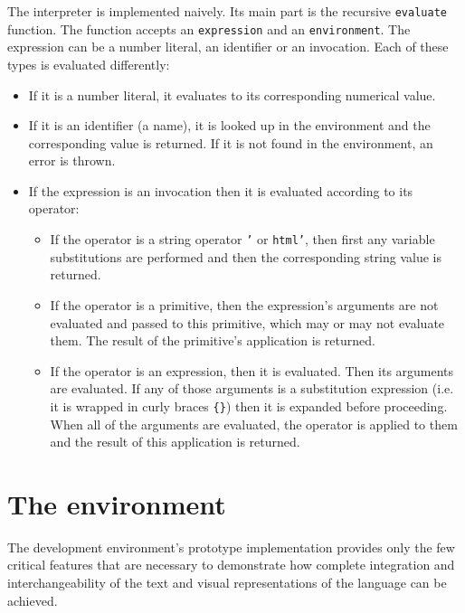 The interpreter is implemented naively. Its main part is the recursive \texttt{evaluate} function. The function accepts an \texttt{expression} and an \texttt{environment}. The expression can be a number literal, an identifier or an invocation. Each of these types is evaluated differently:
\begin{itemize}
\item If it is a number literal, it evaluates to its corresponding numerical value.

\item If it is an identifier (a name), it is looked up in the environment and the corresponding value is returned. If it is not found in the environment, an error is thrown.

\item If the expression is an invocation then it is evaluated according to its operator:
\begin{itemize}
\item If the operator is a string operator \texttt{'} or \texttt{html'}, then first any variable substitutions are performed and then the corresponding string value is returned.
\item If the operator is a primitive, then the expression's arguments are not evaluated and passed to this primitive, which may or may not evaluate them. The result of the primitive's application is returned.
\item If the operator is an expression, then it is evaluated. Then its arguments are evaluated. If any of those arguments is a substitution expression (i.e. it is wrapped in curly braces \texttt{\{\}}) then it is expanded before proceeding. When all of the arguments are evaluated, the operator is applied to them and the result of this application is returned.
\end{itemize}
\end{itemize}   


\section{The environment}
The development environment's prototype implementation provides only the few critical features that are necessary to demonstrate how complete integration and interchangeability of the text and visual representations of the language can be achieved.

